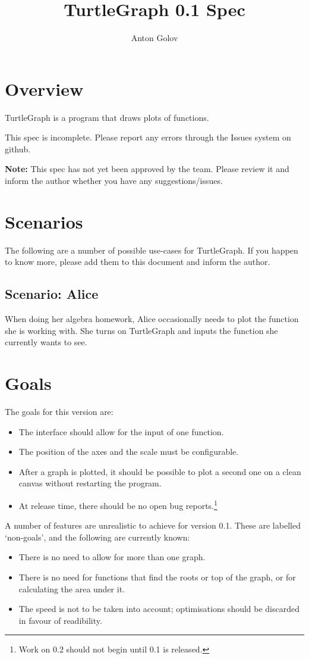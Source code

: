 \documentclass[12pt,a4paper]{article}
\title{TurtleGraph 0.1 Spec}
\author{Anton Golov}
\begin{document}
	\maketitle{}
	\newpage
	\tableofcontents{}
	\newpage
	\section{Overview}
		TurtleGraph is a program that draws plots of functions.

		This spec is incomplete.  Please report any errors through the Issues system on github.

		\textbf{Note:} This spec has not yet been approved by the team.  Please review it and inform the author whether you have any suggestions/issues.

	\section{Scenarios}
		The following are a number of possible use-cases for TurtleGraph.  If you happen to know more, please add them to this document and inform the author.
		\subsection{Scenario: Alice}
			When doing her algebra homework, Alice occasionally needs to plot the function she is working with.  She turns on TurtleGraph and inputs the function she currently wants to see.

	\section{Goals}
		The goals for this version are:
		\begin{itemize}
			\item The interface should allow for the input of one function.
			\item The position of the axes and the scale must be configurable.
			\item After a graph is plotted, it should be possible to plot a second one on a clean canvas without restarting the program.
			\item At release time, there should be no open bug reports.\footnote{Work on 0.2 should not begin until 0.1 is released.}
		\end{itemize}

		A number of features are unrealistic to achieve for version 0.1.  These are labelled `non-goals', and the following are currently known:
		\begin{itemize}
			\item There is no need to allow for more than one graph.
			\item There is no need for functions that find the roots or top of the graph, or for calculating the area under it.
			\item The speed is not to be taken into account; optimisations should be discarded in favour of readibility.
		\end{itemize}
\end{document}
